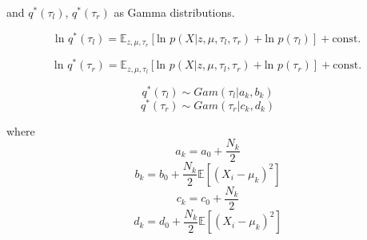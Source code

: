 \documentclass[runningheads]{llncs}
\begin{document}
and $q^*(\tau_l)$, $q^*(\tau_r)$ as Gamma distributions. 

\begin{equation}
   \text{ln }q^*(\tau_l) = \mathbb{E}_{z,\mu,\tau_r}[\text{ln }p(X|z,\mu,\tau_l,\tau_r) + \text{ln }p(\tau_l)] + \text{const.}
\end{equation}

\begin{equation}
   \text{ln }q^*(\tau_r) = \mathbb{E}_{z,\mu,\tau_l}[\text{ln }p(X|z,\mu,\tau_l,\tau_r) + \text{ln }p(\tau_r)] + \text{const.}
\end{equation}

\begin{equation}
   q^*(\tau_l)	\sim Gam(\tau_l|a_k,b_k)
\end{equation}
\begin{equation}
   q^*(\tau_r)	\sim Gam(\tau_r|c_k,d_k)
\end{equation}

where 
\begin{equation} 
   a_k =a_0+\frac{N_k}{2}
\end{equation}
\begin{equation} 
   b_k=b_0+\frac{N_k}{2}\mathbb{E}[(X_i-\mu_k)^2]
\end{equation}
\begin{equation} 
   c_k =c_0+\frac{N_k}{2}
\end{equation}
\begin{equation} 
   d_k=d_0+\frac{N_k}{2}\mathbb{E}[(X_i-\mu_k)^2]
\end{equation}
\end{document}
